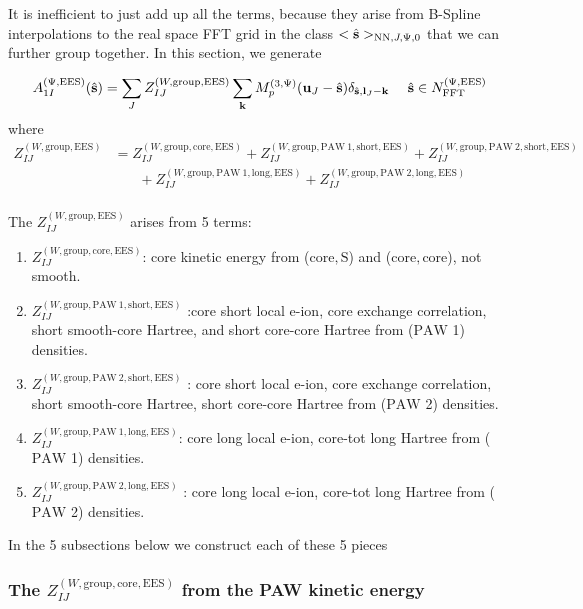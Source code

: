 \documentclass[paper=a4, fontsize=11pt]{article} %
\numberwithin{equation}{section} %
\numberwithin{figure}{section} %
\numberwithin{table}{section} %
\newcommand{\bu}{{\bf{u}}}
\newcommand{\bl}{{\bf{l}}}
\newcommand{\bk}{{\bf{k}}}
\newcommand{\bs}{{\bf{s}}}
\newcommand{\hs}{{\hat{\bf{s}}}}
\newcommand{\rS}{{\mathrm{S}}}
\newcommand{\rEES}{{\mathrm{EES}}}
\newcommand{\rgr}{{\mathrm{group}}}
\newcommand{\rcore}{{\mathrm{core}}}
\newcommand{\rNN}{{\mathrm{NN}}}
\newcommand{\rshort}{{\mathrm{short}}}
\newcommand{\rlong}{{\mathrm{long}}}
\newcommand{\rP}{{\mathrm{PAW}}}
\newcommand{\NFFTpEES}{{N^{\mathrm{(\Psi,\rEES})}_{\mathrm{FFT}}}}
\newcommand{\Mp}{{M_p^{(3,\Psi)}}}
\newcommand{\hsJpzr}{{<\hs>_{\rNN,J,\Psi,0}}}
\newcommand{\hsinpEES}{{\ \ \ \ \hs \in \NFFTpEES}}
\begin{document}
It is inefficient to just add up all the terms, because they arise from B-Spline interpolations to the real space FFT grid in the class $\hsJpzr$ that we can further group together. In this section, we generate 

\begin{equation}
\begin{split}\label{gr:A1pEES}
A_{1I}^{(\Psi,\rEES)}(\hs)
&= \sum_J Z_{IJ}^{(W,\rgr,\rEES)} \sum_{\bk} \Mp(\bu_{J}-\hat \bs) \delta_{\hat \bs,\bl_J-\bk} \hsinpEES \\ 
\end{split}
\end{equation}
where
\begin{equation}
\begin{split}
Z_{IJ} ^{(W,\rgr,\rEES)} &= Z_{IJ}^{(W,\rgr,\rcore,\rEES)} + Z_{IJ}^{(W,\rgr,\rP\ 1,\rshort,\rEES)} + Z_{IJ}^{(W,\rgr,\rP\ 2,\rshort,\rEES)}\\
&\ \ \ \ \ \ \ \ + Z_{IJ}^{(W,\rgr,\rP\ 1,\rlong,\rEES)} + Z_{IJ}^{(W,\rgr,\rP\ 2,\rlong,\rEES)}\\
\end{split}
\end{equation}

The $Z_{IJ} ^{(W,\rgr,\rEES)}$ arises from 5 terms:
\begin{enumerate}
\item $Z_{IJ}^{(W,\rgr,\rcore,\rEES)}$: core kinetic energy from ($\rcore,\rS$) and ($\rcore,\rcore$), not smooth. 
\item $Z_{IJ}^{(W,\rgr,\rP\ 1,\rshort,\rEES)}$ :core short local e-ion, core exchange correlation, short smooth-core Hartree, and short core-core Hartree from ($\rP$ 1) densities.
\item $Z_{IJ}^{(W,\rgr,\rP\ 2,\rshort,\rEES)}$ : core short local e-ion, core exchange correlation, short smooth-core Hartree, short core-core Hartree from ($\rP$ 2) densities.
\item $Z_{IJ}^{(W,\rgr,\rP\ 1,\rlong,\rEES)}$: core long local e-ion, core-tot long Hartree from ($\rP$ 1) densities.
\item $Z_{IJ}^{(W,\rgr,\rP\ 2,\rlong,\rEES)}$ : core long local e-ion, core-tot long Hartree from ($\rP$ 2) densities.
\end{enumerate}
In the 5 subsections below we construct each of these 5 pieces

\subsubsection{The $Z_{IJ}^{(W,\rgr,\rcore,\rEES)}$ from the PAW kinetic energy}
\end{document}
